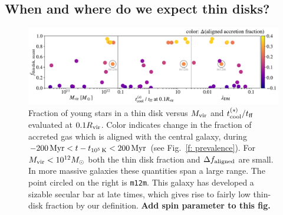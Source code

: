 \documentclass[fleqn,usenatbib]{mnras}
\newcommand{\tcools}{t_{10^5\,{\rm K}}}
\begin{document}
\subsection{When and where do we expect thin disks?}

\begin{figure}
    \centering
    \includegraphics[width=\textwidth]{figures/prevalence/aligned_fraction_vs_galaxy_props.pdf}
    \caption{
    Fraction of young stars in a thin disk versus $M_{\rm vir}$ and $t_{\rm cool}^{(s)}/t_{\rm ff}$ evaluated at $0.1 R_{\rm vir}$.
    Color indicates change in the fraction of accreted gas which is aligned with the central galaxy, during $-200\,{\rm Myr} < t-\tcools < 200\,{\rm Myr}$ (see Fig.~\ref{f: prevalence}).
    For $M_{\rm vir} < 10^{12} M_\odot$ both the thin disk fraction and $\Delta f_{\rm aligned}$ are small.
    In more massive galaxies these quantities span a large range.
    The point circled on the right is \texttt{m12m}.
    This galaxy has developed a sizable secular bar at late times, which gives rise to fairly low thin-disk fraction by our definition.
    \textbf{Add spin parameter to this fig.}
    }
    \label{f: prevalence vs galaxy properties}
\end{figure}

\newcommand{\tcoolsh}{t_{\rm cool}^{(s)}}
\newcommand{\tff}{t_{\rm ff}}
\newcommand{\Mvir}{M_{\rm vir}}
\end{document}

